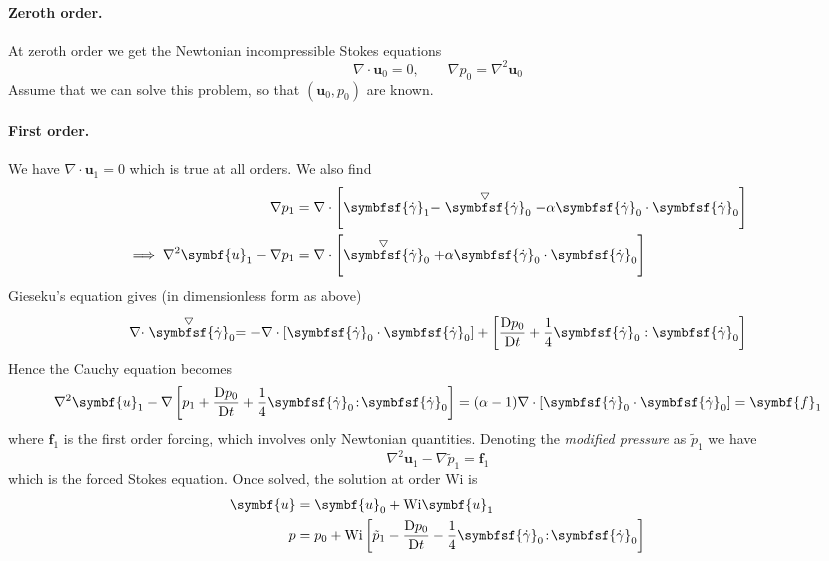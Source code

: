 \documentclass{jknotes}
\newcommand{\ucd}[1]{\stackrel{\bigtriangledown}{#1}}
\begin{document}
\paragraph{Zeroth order.} At zeroth order we get 
the Newtonian incompressible Stokes equations
\begin{equation}
	\nabla \cdot \symbf{u}_0 = 0, \hspace{2em} \nabla p_0 = \nabla^2
	\symbf{u}_0
\end{equation}
Assume that we can solve this problem, so that $(\symbf{u}_0,p_0)$ are known.
\paragraph{First order.} We have $\nabla \cdot \symbf{u}_1 = 0$ which is true
at all orders. We also find
\begin{align}
	\nabla p_1 &= \nabla \cdot \left[ \symbfsf{\srate}_1 -
		\ucd{\symbfsf{\srate}}_0 - \alpha
	\symbfsf{\srate}_0\cdot\symbfsf{\srate}_0 \right] \\
	\implies \nabla^2 \symbf{u}_1 - \nabla p_1 &= \nabla \cdot \left[
		\ucd{\symbfsf{\srate}}_0 + \alpha
	\symbfsf{\srate}_0\cdot\symbfsf{\srate}_0\right]
\end{align}
Gieseku's equation gives (in dimensionless form as above)
\begin{equation}
	\nabla \cdot \ucd{\symbfsf{\srate}}_0 = -\nabla \cdot \left[
		\symbfsf{\srate}_0 \cdot \symbfsf{\srate}_0\right] + \left[
		\frac{\diffD p_0}{\diffD t} +
	\frac{1}{4}\symbfsf{\srate}_0:\symbfsf{\srate}_0\right]
\end{equation}
Hence the Cauchy equation becomes
\begin{equation}
	\nabla^2 \symbf{u}_1 - \nabla \left[ p_1 + \frac{\diffD p_0}{\diffD t} +
	\frac{1}{4}\symbfsf{\srate}_0\!:\!\symbfsf{\srate}_0\right] =
	(\alpha-1)\nabla \cdot \left[
	\symbfsf{\srate}_0\cdot\symbfsf{\srate}_0\right] = \symbf{f}_1
\end{equation}
where $\symbf{f}_1$ is the first order forcing, which involves only Newtonian
quantities. Denoting the \emph{modified pressure} as $\tilde{p}_1$ we have
\begin{equation}
	\nabla^2 \symbf{u}_1 - \nabla \tilde{p}_1 = \symbf{f}_1
\end{equation}
which is the forced Stokes equation. Once solved, the solution at order
$\text{Wi}$ is
\begin{align}
	\symbf{u} &= \symbf{u}_0 + \text{Wi}\symbf{u}_1 \\
	p &= p_0 + \text{Wi}\left[ \tilde{p}_1 - \frac{\diffD p_0}{\diffD t} -
	\frac{1}{4}\symbfsf{\srate}_0\!:\!\symbfsf{\srate}_0\right]
\end{align}
\end{document}
